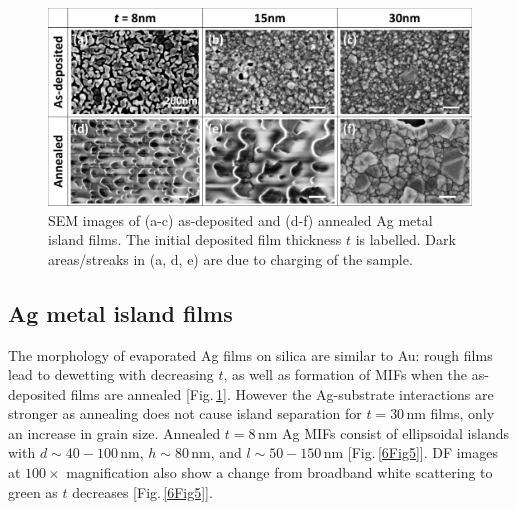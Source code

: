 \begin{figure}[h!] 
\centering    
\includegraphics[width=\textwidth]{Fig4}
\caption{SEM images of (a-c) as-deposited and (d-f) annealed Ag metal island films. The initial deposited film thickness $t$ is labelled. Dark areas/streaks in (a, d, e) are due to charging of the sample.}
\label{6Fig4}
\end{figure}
\subsection{Ag metal island films}

The morphology of evaporated Ag films on silica are similar to Au: rough films lead to dewetting with decreasing $t$, as well as formation of MIFs when the as-deposited films are annealed [Fig.\,\ref{6Fig4}]. However the Ag-substrate interactions are stronger as annealing does not cause island separation for $t=30$\,nm films, only an increase in grain size. Annealed $t=8$\,nm Ag MIFs consist of ellipsoidal islands with $d \sim40-100$\,nm, $h\sim80$\,nm, and $l\sim50-150$\,nm [Fig.\,\ref{6Fig5}]. DF images at $100\times$ magnification also show a change from broadband white scattering to green as $t$ decreases [Fig.\,\ref{6Fig5}]. 

